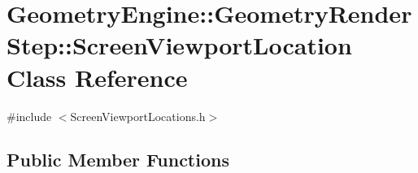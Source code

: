 \hypertarget{class_geometry_engine_1_1_geometry_render_step_1_1_screen_viewport_location}{}\section{Geometry\+Engine\+::Geometry\+Render\+Step\+::Screen\+Viewport\+Location Class Reference}
\label{class_geometry_engine_1_1_geometry_render_step_1_1_screen_viewport_location}


{\ttfamily \#include $<$Screen\+Viewport\+Locations.\+h$>$}

\subsection*{Public Member Functions}
